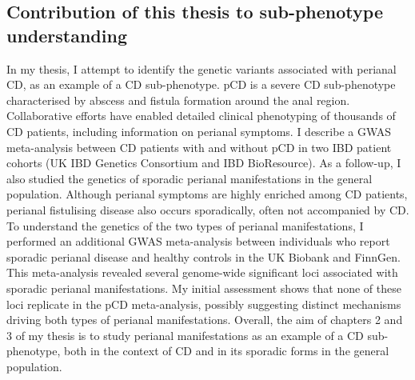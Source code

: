 \subsection{Contribution of this thesis to sub-phenotype understanding}
In my thesis, I attempt to identify the genetic variants associated with perianal CD, as an example of a CD sub-phenotype. pCD is a severe CD sub-phenotype characterised by abscess and fistula formation around the anal region. Collaborative efforts have enabled detailed clinical phenotyping of thousands of CD patients, including information on perianal symptoms. I describe a GWAS meta-analysis between CD patients with and without pCD in two IBD patient cohorts (UK IBD Genetics Consortium and IBD BioResource). As a follow-up, I also studied the genetics of sporadic perianal manifestations in the general population. Although perianal symptoms are highly enriched among CD patients, perianal fistulising disease also occurs sporadically, often not accompanied by CD. To understand the genetics of the two types of perianal manifestations, I performed an additional GWAS meta-analysis between individuals who report sporadic perianal disease and healthy controls in the UK Biobank and FinnGen. This meta-analysis revealed several genome-wide significant loci associated with sporadic perianal manifestations. My initial assessment shows that none of these loci replicate in the pCD meta-analysis, possibly suggesting distinct mechanisms driving both types of perianal manifestations. Overall, the aim of chapters 2 and 3 of my thesis is to study perianal manifestations as an example of a CD sub-phenotype, both in the context of CD and in its sporadic forms in the general population. 









